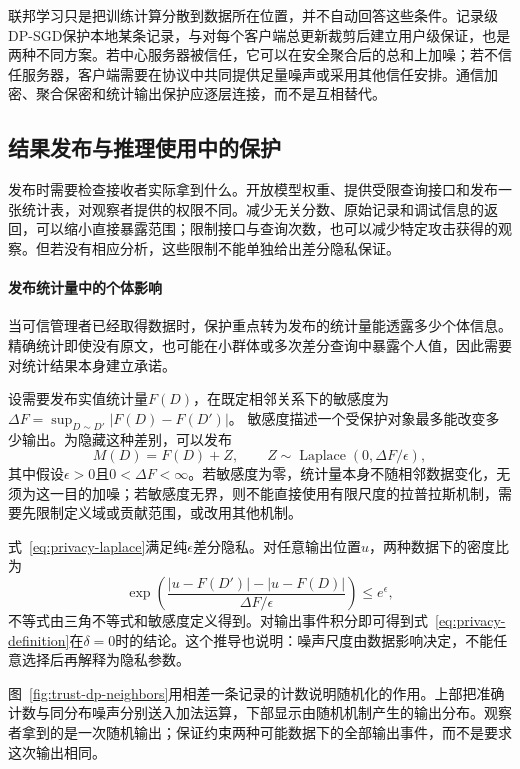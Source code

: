 联邦学习只是把训练计算分散到数据所在位置，并不自动回答这些条件。记录级DP-SGD保护本地某条记录，与对每个客户端总更新裁剪后建立用户级保证，也是两种不同方案。若中心服务器被信任，它可以在安全聚合后的总和上加噪；若不信任服务器，客户端需要在协议中共同提供足量噪声或采用其他信任安排。通信加密、聚合保密和统计输出保护应逐层连接，而不是互相替代。

\subsection{结果发布与推理使用中的保护}
\label{sec:privacy-statistical-release}

发布时需要检查接收者实际拿到什么。开放模型权重、提供受限查询接口和发布一张统计表，对观察者提供的权限不同。减少无关分数、原始记录和调试信息的返回，可以缩小直接暴露范围；限制接口与查询次数，也可以减少特定攻击获得的观察。但若没有相应分析，这些限制不能单独给出差分隐私保证。

\paragraph{发布统计量中的个体影响}

当可信管理者已经取得数据时，保护重点转为发布的统计量能透露多少个体信息。精确统计即使没有原文，也可能在小群体或多次差分查询中暴露个人值，因此需要对统计结果本身建立承诺。

设需要发布实值统计量$F(D)$，在既定相邻关系下的敏感度为
$\Delta F=\sup_{D\sim D'}|F(D)-F(D')|$。
敏感度描述一个受保护对象最多能改变多少输出。为隐藏这种差别，可以发布
\begin{equation}
 M(D)=F(D)+Z,\qquad
 Z\sim\operatorname{Laplace}(0,\Delta F/\epsilon),
 \label{eq:privacy-laplace}
\end{equation}
其中假设$\epsilon>0$且$0<\Delta F<\infty$。若敏感度为零，统计量本身不随相邻数据变化，无须为这一目的加噪；若敏感度无界，则不能直接使用有限尺度的拉普拉斯机制，需要先限制定义域或贡献范围，或改用其他机制。

式~\eqref{eq:privacy-laplace}满足纯$\epsilon$差分隐私。对任意输出位置$u$，两种数据下的密度比为
\[
 \exp\left(
 \frac{|u-F(D')|-|u-F(D)|}{\Delta F/\epsilon}
 \right)\leq e^\epsilon,
\]
不等式由三角不等式和敏感度定义得到。对输出事件积分即可得到式~\eqref{eq:privacy-definition}在$\delta=0$时的结论。这个推导也说明：噪声尺度由数据影响决定，不能任意选择后再解释为隐私参数。

图~\ref{fig:trust-dp-neighbors}用相差一条记录的计数说明随机化的作用。上部把准确计数与同分布噪声分别送入加法运算，下部显示由随机机制产生的输出分布。观察者拿到的是一次随机输出；保证约束两种可能数据下的全部输出事件，而不是要求这次输出相同。

